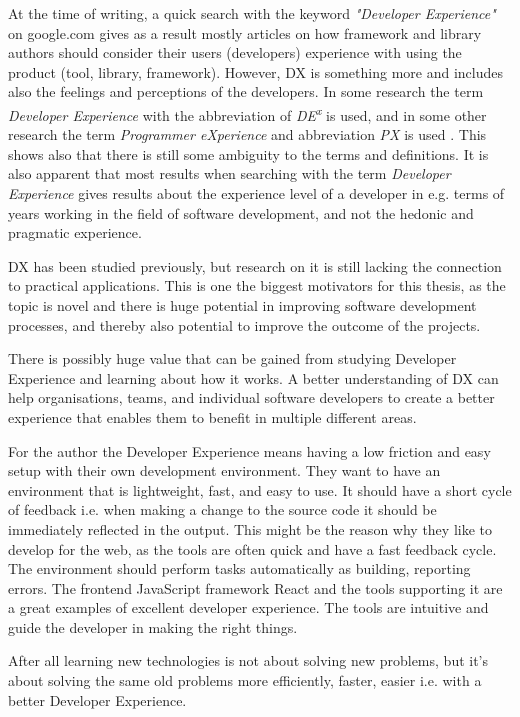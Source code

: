\documentclass[english, 12pt, a4paper, sci, utf8, a-1b, online]{aaltothesis}
\begin{document}
At the time of writing, a quick search with the keyword \textit{"Developer Experience"} on google.com gives as a result mostly articles on how framework and library authors should consider their users (developers) experience with using the product (tool, library, framework). However, DX is something more and includes also the feelings and perceptions of the developers. In some research the term \textit{Developer Experience} with the abbreviation of \textit{DE\textsuperscript{x}} is used, and in some other research the term \textit{Programmer eXperience} and abbreviation \textit{PX} is used \cite{fagerholm-dx-concept-and-definition} \cite{programmer-experience}. This shows also that there is still some ambiguity to the terms and definitions. It is also apparent that most results when searching with the term \textit{Developer Experience} gives results about the experience level of a developer in e.g. terms of years working in the field of software development, and not the hedonic and pragmatic experience.

DX has been studied previously, but research on it is still lacking the connection to practical applications. This is one the biggest motivators for this thesis, as the topic is novel and there is huge potential in improving software development processes, and thereby also potential to improve the outcome of the projects.

There is possibly huge value that can be gained from studying Developer Experience and learning about how it works. A better understanding of DX can help organisations, teams, and individual software developers to create a better experience that enables them to benefit in multiple different areas.

For the author the Developer Experience means having a low friction and easy setup with their own development environment. They want to have an environment that is lightweight, fast, and easy to use. It should have a short cycle of feedback i.e. when making a change to the source code it should be immediately reflected in the output. This might be the reason why they like to develop for the web, as the tools are often quick and have a fast feedback cycle. The environment should perform tasks automatically as building, reporting errors. The frontend JavaScript framework React and the tools supporting it are a great examples of excellent developer experience. The tools are intuitive and guide the developer in making the right things.

After all learning new technologies is not about solving new problems, but it's about solving the same old problems more efficiently, faster, easier i.e. with a better Developer Experience.
\end{document}
